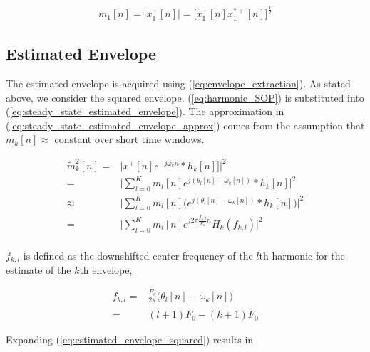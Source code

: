 \documentclass [11pt, proquest,oneside] {ganter_thesis}[2015/03/03]
\begin{document}
\begin{align}
\label{eq:square_root_relationship}
m_1[n] = \Big|x^+_1[n]\Big| = \Big[ x^+_1[n] x^{*+}_1[n] \Big]^\frac{1}{2}
\end{align}

\subsection{Estimated Envelope}

The estimated envelope is acquired using (\ref{eq:envelope_extraction}).  As stated above, we consider the squared envelope.  (\ref{eq:harmonic_SOP}) is substituted into (\ref{eq:steady_state_estimated_envelope}).  The approximation in (\ref{eq:steady_state_estimated_envelope_approx}) comes from the assumption that $m_k[n] \approx$ constant over short time windows.

\begin{align}
\label{eq:steady_state_estimated_envelope}
\tilde{m}_k^2[n] =& \Big| x^+[n]e^{-j \omega_kn} * h_k[n]]  \Big|^2 \\
%
=& \Bigg|  \sum\limits_{l=0}^K m_l[n]e^{j(\theta_l[n] - \omega_k[n])}*h_k[n] \Bigg|^2 \\
%
\label{eq:steady_state_estimated_envelope_approx}
\approx& \Bigg|  \sum\limits_{l=0}^K m_l[n] \Big(e^{j(\theta_l[n] - \omega_k[n])}*h_k[n] \Big) \Bigg|^2  \\
%
\label{eq:estimated_envelope_squared}
=& \Bigg|  \sum\limits_{l=0}^K m_l[n] e^{j2\pi\frac{f_{k,l}}{F_s}n} H_k(f_{k,l}) \Bigg|^2 \\
%
\end{align}

$f_{k,l}$ is defined as the downshifted center frequency of the $l$th harmonic for the estimate of the $k$th envelope,

\begin{align}
\label{eq:downshift_radian_frequency}
f_{k,l} =& \frac{F_s}{2\pi}\Big(\theta_l[n] - \omega_k[n]\Big) \nonumber \\
=& (l+1)F_0 - (k+1)\tilde{F}_0
\end{align}

Expanding (\ref{eq:estimated_envelope_squared}) results in
\end{document}
